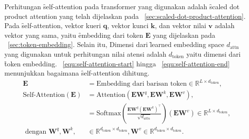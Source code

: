 	Perhitungan \f{self-attention} pada \f{transformer} yang digunakan adalah \f{scaled dot product attention} yang telah dijelaskan pada \sect~\ref{sec:scaled-dot-product-attention}. Pada \f{self-attention}, vektor kueri $\mathbf{q}$, vektor kunci $\mathbf{k}$, dan vektor nilai $\mathbf{v}$ adalah vektor yang sama, yaitu \f{embedding} dari token $\mathbf{E}$ yang dijelaskan pada \sect~\ref{sec:token-embedding}. Selain itu, Dimensi dari \f{learned embedding space} $d_{\text{attn}}$ yang digunakan untuk perhitungan nilai atensi adalah $d_{\text{token}}$ yaitu dimensi dari \f{token embedding}. \equ~\ref{equ:self-attention-start} hingga \equ~\ref{equ:self-attention-end} menunjukkan bagaimana \f{self-attention} dihitung.
	\begin{align}
		\label{equ:self-attention-start}
		\mathbf{E} &= \text{Embedding dari barisan token} \in \mathbb{R}^{L \times d_{\text{token}}}, \\
		\text{Self-Attention}(\mathbf{E}) &= \text{Attention}(\mathbf{EW}^q, \mathbf{EW}^k, \mathbf{EW}^v), \\
		\label{equ:self-attention-end}
		&= \text{Softmax}(\frac{\mathbf{E} \mathbf{W}^q (\mathbf{E} \mathbf{W}^k)^{\top}}{\sqrt{d_{attn}}}) (\mathbf{E} \mathbf{W}^v) \in \mathbb{R}^{L \times d_{\text{token}}}, \\
		\text{ dengan } \mathbf{W}^q, \mathbf{W}^k, &\in \mathbb{R}^{d_{\text{token}} \times d_{\text{token}}}, \mathbf{W}^v \in \mathbb{R}^{d_{\text{token}} \times d_{\text{token}}}.
	\end{align}


